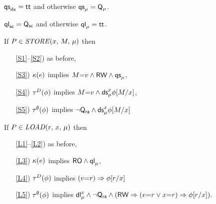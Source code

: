 \begin{definition}$\phantom{\;}$\par
  $\QS{}{\mRLX}=\TRUE$ and otherwise $\QS{}{\amode}=\Q{\amode}$.

  $\QL{}{\mSC}=\Q{\mSC}$ and otherwise $\QL{}{\amode}=\TRUE$.

  \smallskip

  \noindent
  If $\aPS \in \sSTORE[\amode]{\aLoc}{\aExp}$ then
  \begin{enumerate}
  \item[\ref{S1}--\ref{S2})] as before,
  \item[\ref{S3})]
    $\labelingForm(\aEv)$ implies
    \begin{math}
      \aExp{=}\aVal
      \land \RW
      \land \QS{}{\amode}
    \end{math},
  \item[\ref{S4})]
    $\aTr[\bEvs](\aForm)$ implies 
    \begin{math}
      \aExp{=}\aVal
      \land \DS{\aLoc}{\amode}{\aForm[\aExp/{\aLoc}]}
    \end{math},
  \item[\ref{S5})]
    $\aTr[\emptyset](\aForm)$ implies 
    \begin{math}
      \lnot\Q{\mRA}
      \land \DS{\aLoc}{\amode}{\aForm[\aExp/{\aLoc}]}
    \end{math}
  \end{enumerate}

  \noindent
  If $\aPS \in \sLOAD[\amode]{\aReg}{\aLoc}$ then
  \begin{enumerate}
  \item[\ref{L1}--\ref{L2})] as before,
  \item[\ref{L3})] $\labelingForm(\aEv)$ implies
    \begin{math}
      \RO
      \land \QL{}{\amode}
    \end{math},
  \item[\ref{L4})]
    $\aTr[\bEvs](\aForm)$ implies
    \begin{math}
      (\aVal{=}\aReg)
      \limplies \aForm[\aReg/{\aLoc}]
    \end{math}
  \item[\ref{L5})] 
    $\aTr[\emptyset](\aForm)$ implies
    \begin{math}
      \DL{\aLoc}{\amode}
      \land \lnot\Q{\mRA}
      \land
      (\RW
      \limplies (\aVal{=}\aReg\lor\aLoc{=}\aReg) 
      \limplies \aForm[\aReg/{\aLoc}]
      ).
    \end{math}
  \end{enumerate}  
\end{definition}


